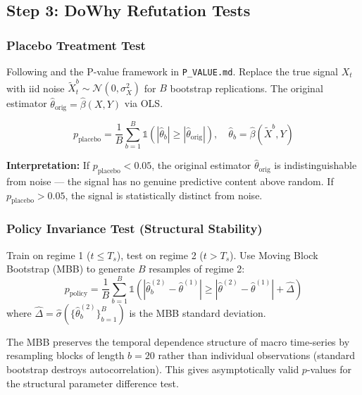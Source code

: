 \documentclass[12pt,a4paper]{article}
\begin{document}
\subsection{Step 3: DoWhy Refutation Tests}

\subsubsection{Placebo Treatment Test}

Following \citet{bailey2014} and the P-value framework in \texttt{P\_VALUE.md}. Replace the true signal $X_t$ with iid noise $\tilde{X}_t^b \sim \mathcal{N}(0, \sigma_X^2)$ for $B$ bootstrap replications. The original estimator $\hat{\theta}_{\text{orig}} = \hat{\beta}(X, Y)$ via OLS.

\begin{equation}
  p_{\text{placebo}} = \frac{1}{B}\sum_{b=1}^{B}\mathbb{1}\!\left(|\hat{\theta}_b| \geq |\hat{\theta}_{\text{orig}}|\right),
  \quad \hat{\theta}_b = \hat{\beta}(\tilde{X}^b, Y)
  \label{eq:placebo_p}
\end{equation}

\textbf{Interpretation:} If $p_{\text{placebo}} < 0.05$, the original estimator $\hat{\theta}_{\text{orig}}$ is indistinguishable from noise — the signal has no genuine predictive content above random. If $p_{\text{placebo}} > 0.05$, the signal is statistically distinct from noise.

\subsubsection{Policy Invariance Test (Structural Stability)}

Train on regime 1 ($t \leq T_s$), test on regime 2 ($t > T_s$). Use Moving Block Bootstrap (MBB) to generate $B$ resamples of regime 2:
\begin{equation}
  p_{\text{policy}} = \frac{1}{B}\sum_{b=1}^{B}
    \mathbb{1}\!\left(|\hat{\theta}_b^{(2)} - \hat{\theta}^{(1)}| \geq |\hat{\theta}^{(2)} - \hat{\theta}^{(1)}| + \hat{\Delta}\right)
  \label{eq:policy_p}
\end{equation}
where $\hat{\Delta} = \hat{\sigma}(\{\hat{\theta}_b^{(2)}\}_{b=1}^B)$ is the MBB standard deviation.

The MBB preserves the temporal dependence structure of macro time-series by resampling blocks of length $b=20$ rather than individual observations (standard bootstrap destroys autocorrelation). This gives asymptotically valid $p$-values for the structural parameter difference test.
\end{document}
